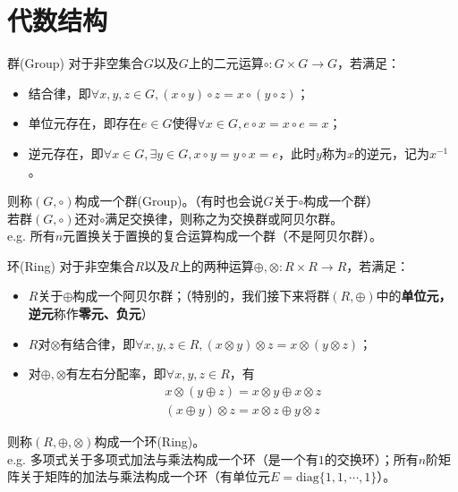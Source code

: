 \documentclass{beamer}
\begin{document}
\section{代数结构}
\begin{frame}{群(Group)}
	对于非空集合$G$以及$G$上的二元运算$\circ: G \times G \to G$，若满足：
	\begin{itemize}
		\item 结合律，即$\forall x, y, z \in G, (x \circ y) \circ z = x \circ (y \circ z)$；
		\item 单位元存在，即存在$e \in G$使得$\forall x \in G, e \circ x = x \circ e = x$；
		\item 逆元存在，即$\forall x \in G, \exists y \in G, x \circ y = y \circ x = e$，此时$y$称为$x$的逆元，记为$x^{-1}$。
	\end{itemize}
	
	则称$(G, \circ)$构成一个群(Group)。（有时也会说$G$关于$\circ$构成一个群）\\
	
	若群$(G, \circ)$还对$\circ$满足交换律，则称之为交换群或阿贝尔群。\\
	
	e.g. 所有$n$元置换关于置换的复合运算构成一个群（不是阿贝尔群）。
\end{frame}
\begin{frame}{环(Ring)}
	对于非空集合$R$以及$R$上的两种运算$\oplus, \otimes: R \times R \to R$，若满足：
	\begin{itemize}
		\item $R$关于$\oplus$构成一个阿贝尔群；（特别的，我们接下来将群$(R, \oplus)$中的\textbf{单位元，逆元}称作\textbf{零元、负元}）
		\item $R$对$\otimes$有结合律，即$\forall x, y, z \in R, (x \otimes y) \otimes z = x \otimes (y \otimes z)$；
		\item 对$\oplus, \otimes$有左右分配率，即$\forall x, y, z \in R$，有\begin{align*}x \otimes(y \oplus z) = x \otimes y \oplus x \otimes z\\(x \oplus y) \otimes z = x \otimes z \oplus y \otimes z
		\end{align*}
	\end{itemize}
	
	则称$(R, \oplus, \otimes)$构成一个环(Ring)。\\
	
	e.g. 多项式关于多项式加法与乘法构成一个环（是一个有$1$的交换环）；所有$n$阶矩阵关于矩阵的加法与乘法构成一个环（有单位元$E = \mathrm{diag}\{1, 1, \cdots, 1\}$）。
\end{frame}
\end{document}
